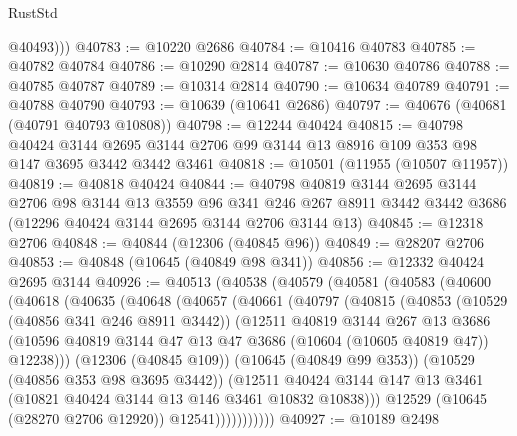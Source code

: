 \begin{lexlean}{RustStd}
\begin{coremodule}
          @40493)))
@40783 := @10220 @2686
@40784 := @10416 @40783
@40785 := @40782 @40784
@40786 := @10290 @2814
@40787 := @10630 @40786
@40788 := @40785 @40787
@40789 := @10314 @2814
@40790 := @10634 @40789
@40791 := @40788 @40790
@40793 := @10639 (@10641 @2686)
@40797 := @40676 (@40681 (@40791 @40793 @10808))
@40798 := @12244 @40424
@40815 := @40798
    @40424
    @3144
    @2695
    @3144
    @2706
    @99
    @3144
    @13
    @8916
    @109
    @353
    @98
    @147
    @3695
    @3442
    @3442
    @3461
@40818 := @10501 (@11955 (@10507 @11957))
@40819 := @40818 @40424
@40844 := @40798
    @40819
    @3144
    @2695
    @3144
    @2706
    @98
    @3144
    @13
    @3559
    @96
    @341
    @246
    @267
    @8911
    @3442
    @3442
    @3686
    (@12296 @40424 @3144 @2695 @3144 @2706 @3144 @13)
@40845 := @12318 @2706
@40848 := @40844 (@12306 (@40845 @96))
@40849 := @28207 @2706
@40853 := @40848 (@10645 (@40849 @98 @341))
@40856 := @12332 @40424 @2695 @3144
@40926 := @40513
    (@40538
      (@40579
        (@40581
          (@40583
            (@40600
              (@40618
                (@40635
                  (@40648
                    (@40657
                      (@40661
                        (@40797
                          (@40815
                            (@40853
                              (@10529 (@40856 @341 @246 @8911 @3442))
                              (@12511
                                @40819
                                @3144
                                @267
                                @13
                                @3686
                                (@10596
                                  @40819
                                  @3144
                                  @47
                                  @13
                                  @47
                                  @3686
                                  (@10604 (@10605 @40819 @47))
                                  @12238)))
                            (@12306 (@40845 @109))
                            (@10645 (@40849 @99 @353))
                            (@10529 (@40856 @353 @98 @3695 @3442))
                            (@12511
                              @40424
                              @3144
                              @147
                              @13
                              @3461
                              (@10821 @40424 @3144 @13 @146 @3461 @10832 @10838)))
                          @12529
                          (@10645 (@28270 @2706 @12920))
                          @12541)))))))))))
@40927 := @10189 @2498

\end{coremodule}
\end{lexlean}
